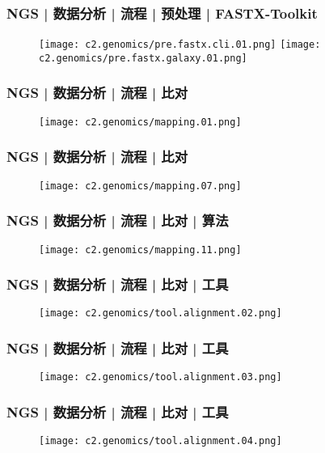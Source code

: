 \begin{frame}
  \frametitle{NGS | 数据分析 | 流程 | 预处理 | FASTX-Toolkit}
  \begin{figure}
    \centering
    \texttt{[image: c2.genomics/pre.fastx.cli.01.png]}
    \texttt{[image: c2.genomics/pre.fastx.galaxy.01.png]}
  \end{figure}
\end{frame}

\begin{frame}
  \frametitle{NGS | 数据分析 | 流程 | 比对}
  \begin{figure}
    \centering
    \texttt{[image: c2.genomics/mapping.01.png]}
  \end{figure}
\end{frame}

\begin{frame}
  \frametitle{NGS | 数据分析 | 流程 | 比对}
  \begin{figure}
    \centering
    \texttt{[image: c2.genomics/mapping.07.png]}
  \end{figure}
\end{frame}

\begin{frame}
  \frametitle{NGS | 数据分析 | 流程 | 比对 | 算法}
  \begin{figure}
    \centering
    \texttt{[image: c2.genomics/mapping.11.png]}
  \end{figure}
\end{frame}

\begin{frame}
  \frametitle{NGS | 数据分析 | 流程 | 比对 | 工具}
  \begin{figure}
    \centering
    \texttt{[image: c2.genomics/tool.alignment.02.png]}
  \end{figure}
\end{frame}

\begin{frame}
  \frametitle{NGS | 数据分析 | 流程 | 比对 | 工具}
  \begin{figure}
    \centering
    \texttt{[image: c2.genomics/tool.alignment.03.png]}
  \end{figure}
\end{frame}

\begin{frame}
  \frametitle{NGS | 数据分析 | 流程 | 比对 | 工具}
  \begin{figure}
    \centering
    \texttt{[image: c2.genomics/tool.alignment.04.png]}
  \end{figure}
\end{frame}

